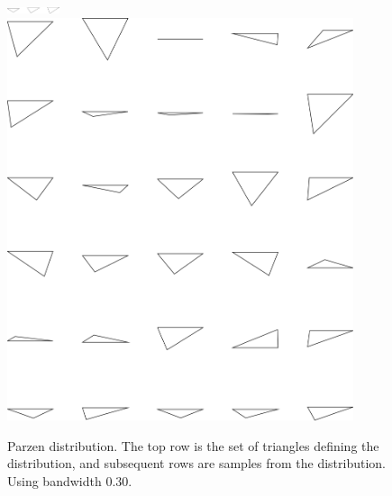 \begin{figure}
\includegraphics[width=0.6in]{output/1.models/test_parzen/parzen_true.png}\\ 
\includegraphics[width=4in]{output/1.models/test_parzen/parzen_0.30_samples.png}\\ 
\caption{Parzen distribution. The top row is the set of triangles
  defining the distribution, and subsequent rows are samples from the
  distribution. Using bandwidth $0.30$. }
\label{fig-parzen-4}
\end{figure}

